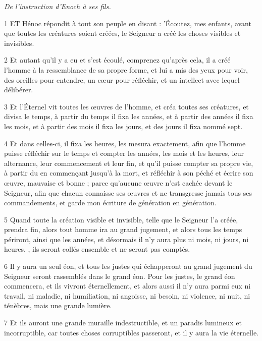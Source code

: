 
\par \textit{De l'instruction d'Enoch à ses fils.}

\par 1 ET Hénoc répondit à tout son peuple en disant : 'Écoutez, mes enfants, avant que toutes les créatures soient créées, le Seigneur a créé les choses visibles et invisibles.

\par 2 Et autant qu'il y a eu et s'est écoulé, comprenez qu'après cela, il a créé l'homme à la ressemblance de sa propre forme, et lui a mis des yeux pour voir, des oreilles pour entendre, un cœur pour réfléchir, et un intellect avec lequel délibérer.

\par 3 Et l'Éternel vit toutes les œuvres de l'homme, et créa toutes ses créatures, et divisa le temps, à partir du temps il fixa les années, et à partir des années il fixa les mois, et à partir des mois il fixa les jours, et des jours il fixa nommé sept.

\par 4 Et dans celles-ci, il fixa les heures, les mesura exactement, afin que l'homme puisse réfléchir sur le temps et compter les années, les mois et les heures, leur alternance, leur commencement et leur fin, et qu'il puisse compter sa propre vie, à partir du en commençant jusqu'à la mort, et réfléchir à son péché et écrire son œuvre, mauvaise et bonne ; parce qu'aucune œuvre n'est cachée devant le Seigneur, afin que chacun connaisse ses œuvres et ne transgresse jamais tous ses commandements, et garde mon écriture de génération en génération.

\par 5 Quand toute la création visible et invisible, telle que le Seigneur l'a créée, prendra fin, alors tout homme ira au grand jugement, et alors tous les temps périront, ainsi que les années, et désormais il n'y aura plus ni mois, ni jours, ni heures. , ils seront collés ensemble et ne seront pas comptés.

\par 6 Il y aura un seul éon, et tous les justes qui échapperont au grand jugement du Seigneur seront rassemblés dans le grand éon. Pour les justes, le grand éon commencera, et ils vivront éternellement, et alors aussi il n'y aura parmi eux ni travail, ni maladie, ni humiliation, ni angoisse, ni besoin, ni violence, ni nuit, ni ténèbres, mais une grande lumière.

\par 7 Et ils auront une grande muraille indestructible, et un paradis lumineux et incorruptible, car toutes choses corruptibles passeront, et il y aura la vie éternelle.

